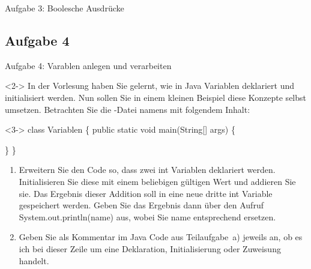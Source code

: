 {\begin{frame}[fragile]{Aufgabe 3: Boolesche Ausdrücke}
\end{frame}
}

\subsection{Aufgabe 4}
\begin{frame}[fragile]{Aufgabe 4: Varablen anlegen und verarbeiten}
    \begin{taskblock}<2->
        In der Vorlesung haben Sie gelernt, wie in Java Variablen deklariert und initialisiert werden. Nun sollen Sie in einem kleinen Beispiel diese Konzepte selbst umsetzen. Betrachten Sie die -Datei namens  mit folgendem Inhalt:\smallskip\begin{uncoverenv}<3->
\begingroup\subdue
class Variablen \{
    public static void main(String[] args) \{

    \}
\}\smallskip
\endgroup
\end{uncoverenv}
\begin{enumerate}
    \itemsep6pt
    \item<4-> Erweitern Sie den Code so, dass zwei int Variablen deklariert werden. Initialisieren Sie diese  mit
    einem beliebigen gültigen Wert und addieren Sie sie. Das Ergebnis dieser Addition soll in eine neue dritte int
    Variable gespeichert werden. Geben Sie das Ergebnis dann über den Aufruf System.out.println(name) aus,
    wobei Sie name entsprechend ersetzen.
    \item<5-> Geben Sie als Kommentar im Java Code aus Teilaufgabe~a) jeweils an, ob es ich bei dieser Zeile um eine Deklaration, Initialisierung oder Zuweisung handelt.
\end{enumerate}
\end{taskblock}
\end{frame}

